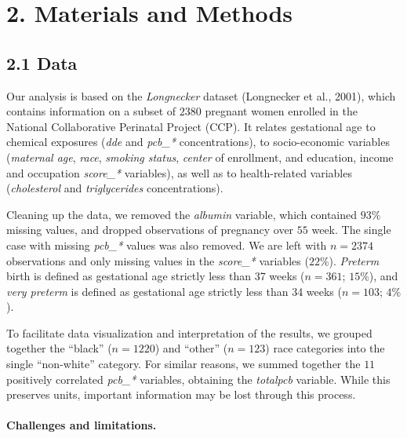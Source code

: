 \documentclass[10pt,]{article}
\begin{document}
\hypertarget{materials-and-methods}{%
\section{2. Materials and Methods}\label{materials-and-methods}}

\hypertarget{data}{%
\subsection{2.1 Data}\label{data}}

Our analysis is based on the \emph{Longnecker} dataset (Longnecker et
al., 2001), which contains information on a subset of \(2380\) pregnant
women enrolled in the National Collaborative Perinatal Project (CCP). It
relates gestational age to chemical exposures (\emph{dde} and
\emph{pcb\_*} concentrations), to socio-economic variables
(\emph{maternal age}, \emph{race}, \emph{smoking status}, \emph{center}
of enrollment, and education, income and occupation \emph{score\_*}
variables), as well as to health-related variables (\emph{cholesterol}
and \emph{triglycerides} concentrations).

Cleaning up the data, we removed the \emph{albumin} variable, which
contained \(93\%\) missing values, and dropped observations of pregnancy
over \(55\) week. The single case with missing \emph{pcb\_*} values was
also removed. We are left with \(n=2374\) observations and only missing
values in the \emph{score\_*} variables (\(22\%\)). \emph{Preterm} birth
is defined as gestational age strictly less than 37 weeks (\(n=361\);
\(15\%\)), and \emph{very preterm} is defined as gestational age
strictly less than 34 weeks (\(n=103\); \(4\%\)).

To facilitate data visualization and interpretation of the results, we
grouped together the ``black'' (\(n = 1220\)) and ``other''
(\(n = 123\)) race categories into the single ``non-white'' category.
For similar reasons, we summed together the \(11\) positively correlated
\emph{pcb\_*} variables, obtaining the \emph{totalpcb} variable. While
this preserves units, important information may be lost through this
process.

\hypertarget{challenges-and-limitations.}{%
\paragraph{Challenges and
limitations.}\label{challenges-and-limitations.}}
\end{document}
